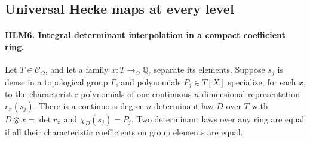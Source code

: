 \subsection{Universal Hecke maps at every level}

\paragraph{HLM6. Integral determinant interpolation in a compact coefficient ring.}
\label{claim:HLM6}
Let \(T\in\mathcal C_O\), and let a family
\(x:T\to_O\overline{\mathbb Q}_\ell\) separate its elements.
Suppose \(s_j\) is dense in a topological group \(\Gamma\),
and polynomials \(P_j\in T[X]\) specialize, for each \(x\),
to the characteristic polynomials of one continuous
\(n\)-dimensional representation \(r_x(s_j)\).
There is a continuous degree-\(n\) determinant law \(D\) over
\(T\) with \(D\otimes x=\det r_x\) and
\(\chi_D(s_j)=P_j\).
Two determinant laws over any ring are equal if all their
characteristic coefficients on group elements are equal.
